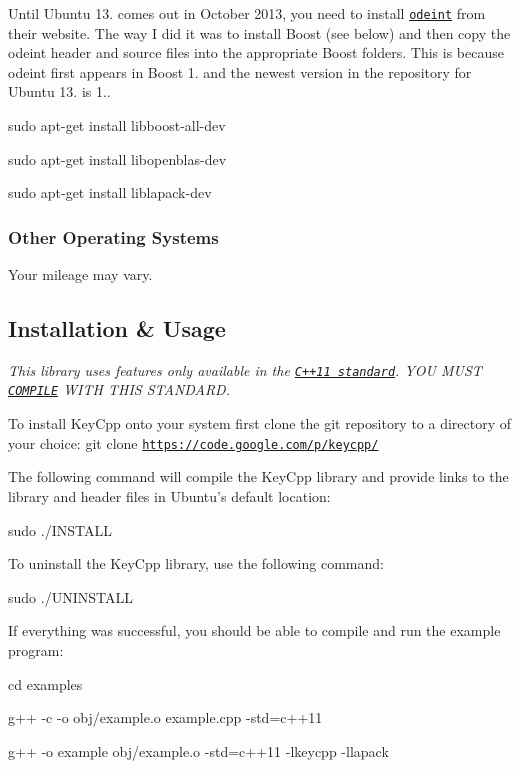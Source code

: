 Until Ubuntu 13. comes out in October 2013, you need to install \href{http://headmyshoulder.github.io/odeint-v2/}{\tt odeint} from their website. The way I did it was to install Boost (see below) and then copy the odeint header and source files into the appropriate Boost folders. This is because odeint first appears in Boost 1. and the newest version in the repository for Ubuntu 13. is 1..

{\ttfamily sudo apt-\/get install libboost-\/all-\/dev}

{\ttfamily sudo apt-\/get install libopenblas-\/dev}

{\ttfamily sudo apt-\/get install liblapack-\/dev}

\subsubsection*{Other Operating Systems}

Your mileage may vary.

\subsection*{Installation \& Usage}

{\itshape This library uses features only available in the \href{https://en.wikipedia.org/wiki/C%2B%2B11}{\tt C++11 standard}. Y\-O\-U M\-U\-S\-T \href{http://gcc.gnu.org/projects/cxx0x.html}{\tt C\-O\-M\-P\-I\-L\-E} W\-I\-T\-H T\-H\-I\-S S\-T\-A\-N\-D\-A\-R\-D.}

To install Key\-Cpp onto your system first clone the git repository to a directory of your choice\-: {\ttfamily git clone \href{https://code.google.com/p/keycpp/}{\tt https\-://code.\-google.\-com/p/keycpp/}}

The following command will compile the Key\-Cpp library and provide links to the library and header files in Ubuntu's default location\-:

{\ttfamily sudo ./\-I\-N\-S\-T\-A\-L\-L}

To uninstall the Key\-Cpp library, use the following command\-:

{\ttfamily sudo ./\-U\-N\-I\-N\-S\-T\-A\-L\-L}

If everything was successful, you should be able to compile and run the example program\-:

{\ttfamily cd examples}

{\ttfamily g++ -\/c -\/o obj/example.\-o example.\-cpp -\/std=c++11}

{\ttfamily g++ -\/o example obj/example.\-o -\/std=c++11 -\/lkeycpp -\/llapack}


